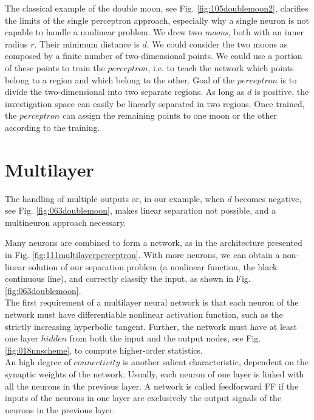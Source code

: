 The classical example of the double moon, see Fig. \ref{fig:105doublemoon2},
clarifies the limits of the single perceptron approach, especially 
why a single neuron is not capable to handle a
nonlinear problem.
We drew two \textit{moons}, both with an inner radius $r$. 
Their minimum distance is $d$.
We could consider the two moons as composed by a finite number of
two-dimensional points.
We could use a portion of these points to train the $perceptron$, i.e. 
to teach the network which points belong to a region and which belong to the
other.
Goal of the $perceptron$ is to divide the two-dimensional
into two separate regions.
As long as $d$ is positive, the investigation space
can easily be linearly separated in two regions.
Once trained, the $perceptron$ can assign the remaining points 
to one moon or the other according to the training.

\section{Multilayer}
\label{sec:multilayer}



The handling of multiple outputs or, in our example, 
when $d$ becomes negative, see Fig. \ref{fig:063doublemoon}, makes linear
separation not possible, and a multineuron approach necessary. 

Many neurons are combined to form a network, as in the architecture presented
in Fig. \ref{fig:111multilayerperceptron}.
With more neurons, we can obtain a non-linear solution of our separation
problem (a nonlinear function, the black continuous line), and correctly
classify the input, as shown in Fig.
\ref{fig:063doublemoon}.\\
The first requirement of a multilayer neural network is that each neuron 
of the network must have differentiable nonlinear activation
function, such as the strictly increasing hyperbolic tangent.
Further, the network must have at least one layer $hidden$ from both the input
and the output nodes, see Fig. \ref{fig:018nnscheme}, to compute higher-order
statistics.\\
An high degree of $connectivity$ is another salient characteristic, dependent on
the synaptic weights of the network.
Usually, each neuron of one layer is linked with all the neurons in the previous
layer.
A network is called feedforward \acs{FF} if the inputs of the neurons in
one layer are exclusively the output signals of the neurons in the previous
layer.\\

